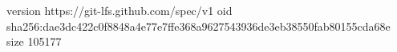version https://git-lfs.github.com/spec/v1
oid sha256:dae3dc422c0f8848a4e77e7ffe368a9627543936de3eb38550fab80155cda68e
size 105177
